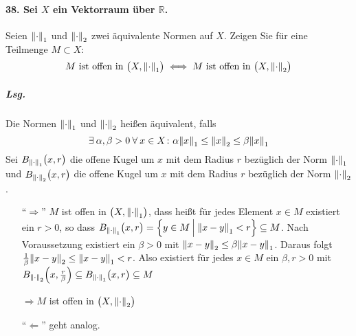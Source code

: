 \documentclass{scrreprt}
\begin{document}
\newpage
\paragraph{38. Sei $X$ ein Vektorraum über $\mathbb{R}$.}
Seien $\norm{\cdot}_1$ und $\norm{\cdot}_2$ zwei äquivalente Normen auf $X$.
Zeigen Sie für eine Teilmenge $M \subset X$:
\[
  M \text{ ist offen in } \qty\big(X, \norm{\cdot}_1) \iff
  M \text{ ist offen in } \qty\big(X, \norm{\cdot}_2)
\]

\subparagraph{Lsg.} Die Normen $\norm{\cdot}_1$ und $\norm{\cdot}_2$
heißen äquivalent, falls
\[
  \exists \: \alpha, \beta > 0 \: \forall \: x \in X \colon
  \alpha\norm{x}_1 \leq \norm{x}_2 \leq \beta\norm{x}_1
\]
Sei $B_{\norm{\cdot}_1}\qty\big(x, r)$ die offene Kugel um $x$ mit dem
Radius $r$ bezüglich der Norm $\norm{\cdot}_1$ und
$B_{\norm{\cdot}_2}\qty\big(x, r)$ die offene Kugel um $x$ mit dem Radius $r$
bezüglich der Norm $\norm{\cdot}_2$.


\begin{itemize}
\item[``$\Rightarrow$''] $M$ ist offen in $\qty\big(X, \norm{\cdot}_1)$,
  dass heißt für jedes Element $x \in M$ existiert ein $r > 0$, so dass
  $B_{\norm{\cdot}_1}\qty\big(x, r) =
  \qty{y \in M \: {\Big |} \: \norm{x - y}_1 < r} \subseteq M$.
  Nach Voraussetzung existiert ein $\beta > 0$ mit
  $\norm{x - y}_2 \leq \beta \norm{x - y}_1$.
  Daraus folgt $\frac{1}{\beta} \norm{x - y}_2 \leq \norm{x - y}_1 < r$.
  Also existiert für jedes $x \in M$ ein $\beta, r > 0$ mit
  $B_{\norm{\cdot}_2}\qty(x, \frac{r}{\beta}) \subseteq
  B_{\norm{\cdot}_1}\qty\big(x, r) \subseteq M$

  $\Rightarrow M$ ist offen in $\qty\big(X, \norm{\cdot}_2)$

\item[``$\Leftarrow$''] geht analog.
\end{itemize}
\end{document}
